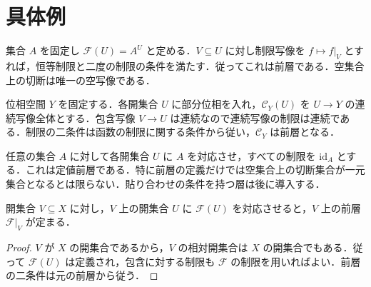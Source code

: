\section{具体例}
\begin{prop}[函数の前層]
集合 $A$ を固定し $\mathcal F(U)=A^U$ と定める．$V\subseteq U$ に対し制限写像を $f\mapsto f|_V$ とすれば，恒等制限と二度の制限の条件を満たす．従ってこれは前層である．空集合上の切断は唯一の空写像である．
\end{prop}
\begin{prop}[連続函数の前層]
位相空間 $Y$ を固定する．各開集合 $U$ に部分位相を入れ，$\mathcal C_Y(U)$ を $U\to Y$ の連続写像全体とする．包含写像 $V\to U$ は連続なので連続写像の制限は連続である．制限の二条件は函数の制限に関する条件から従い，$\mathcal C_Y$ は前層となる．
\end{prop}
\begin{prop}[定値前層]
任意の集合 $A$ に対して各開集合 $U$ に $A$ を対応させ，すべての制限を $\mathrm{id}_A$ とする．これは定値前層である．特に前層の定義だけでは空集合上の切断集合が一元集合となるとは限らない．貼り合わせの条件を持つ層は後に導入する．
\end{prop}
\begin{prop}[開集合への前層の制限]
開集合 $V\subseteq X$ に対し，$V$ 上の開集合 $U$ に $\mathcal F(U)$ を対応させると，$V$ 上の前層 $\mathcal F|_V$ が定まる．
\end{prop}
\begin{proof}
$V$ が $X$ の開集合であるから，$V$ の相対開集合は $X$ の開集合でもある．従って $\mathcal F(U)$ は定義され，包含に対する制限も $\mathcal F$ の制限を用いればよい．前層の二条件は元の前層から従う．
\end{proof}
